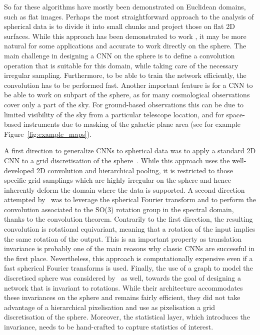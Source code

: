 \documentclass[final,twocolumn,3p,times,authoryear]{elsarticle}
\newcommand{\todo}[1]{{\color[rgb]{.6,.1,.6}{#1}}}
\newcommand{\figref}[1]{Figure~\ref{fig:#1}}
\newcommand{\1}{\b{1}}              %
\newcommand{\0}{\b{0}}              %
\begin{document}
So far these algorithms have mostly been demonstrated on Euclidean domains, such as flat images.
Perhaps the most straightforward approach to the analysis of spherical data is to divide it into small chunks and project those on flat 2D surfaces. 
While this approach has been demonstrated to work \citep{fluri2018deep,gupta2018nongaussianinformation,schmelze2017cosmologicalmodel,gillet2018deeplearning}, it may be more natural for some applications and accurate to work directly on the sphere.
The main challenge in designing a CNN on the sphere is to define a convolution operation that is suitable for this domain, while taking care of the necessary irregular sampling.
Furthermore, to be able to train the network efficiently, the convolution has to be performed fast.
Another important feature is for a CNN to be able to work on subpart of the sphere, as for many cosmological observations cover only a part of the sky.
For ground-based observations this can be due to limited visibility of the sky from a particular telescope location, and for space-based instruments due to masking of the galactic plane area (see for example \figref{example_maps}). 

A first direction to generalize CNNs to spherical data was to apply a standard 2D CNN to a grid discretisation of the sphere~\citep{boomsma2017spherical,su2017sphericalconv,coors2018spherenet}. While this approach uses the well-developed 2D convolution and hierarchical pooling, it is restricted to those specific grid samplings which are highly irregular on the sphere and hence inherently deform the domain where the data is supported. 
A second direction attempted by~\citet{cohen2018sphericalcnn} was to leverage the spherical Fourier transform and to perform the convolution associated to the SO(3) rotation group in the spectral domain, thanks to the convolution theorem.
Contrarily to the first direction, the resulting convolution is rotational equivariant, meaning that a rotation of the input implies the same rotation of the output.
This is an important property as translation invariance is probably one of the main reasons why classic CNNs are successful in the first place.
Nevertheless, this approach is computationally expensive even if a fast spherical Fourier transforms is used. 
Finally, the use of a graph to model the discretised sphere was considered by~\citet{khasanova2017graphomni} as well, towards the goal of designing a  network that is invariant to rotations.
While their architecture accommodates these invariances on the sphere and remains fairly efficient, they did not take advantage of a hierarchical pixelisation and use as pixelisation a grid discretisation of the sphere. 
Moreover, the statistical layer, which introduces the invariance, needs to be hand-crafted to capture statistics of interest.
\end{document}
